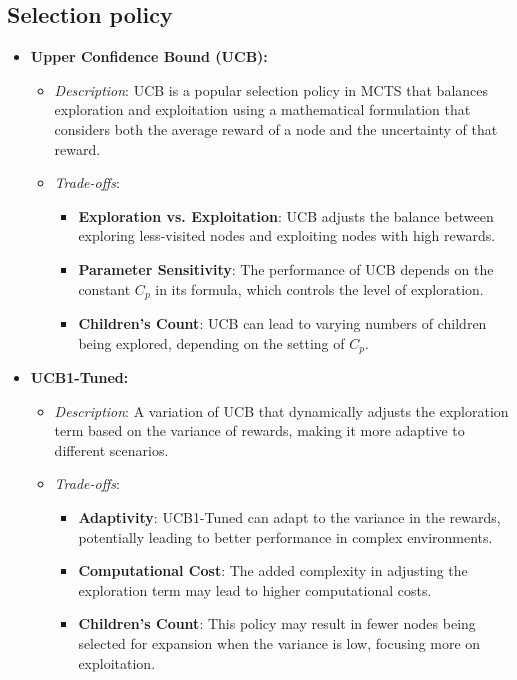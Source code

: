 \subsection{Selection policy}
\cite{different_selection_policies}
\begin{itemize}
    \item \textbf{Upper Confidence Bound (UCB):}
          \begin{itemize}
              \item \textit{Description}: UCB is a popular selection policy in MCTS that balances exploration and exploitation using a mathematical formulation that considers both the average reward of a node and the uncertainty of that reward.
              \item \textit{Trade-offs}:
                    \begin{itemize}
                        \item \textbf{Exploration vs. Exploitation}: UCB adjusts the balance between exploring less-visited nodes and exploiting nodes with high rewards.
                        \item \textbf{Parameter Sensitivity}: The performance of UCB depends on the constant \(C_p\) in its formula, which controls the level of exploration.
                        \item \textbf{Children's Count}: UCB can lead to varying numbers of children being explored, depending on the setting of \(C_p\).
                    \end{itemize}
          \end{itemize}

    \item \textbf{UCB1-Tuned:}
          \begin{itemize}
              \item \textit{Description}: A variation of UCB that dynamically adjusts the exploration term based on the variance of rewards, making it more adaptive to different scenarios.
              \item \textit{Trade-offs}:
                    \begin{itemize}
                        \item \textbf{Adaptivity}: UCB1-Tuned can adapt to the variance in the rewards, potentially leading to better performance in complex environments.
                        \item \textbf{Computational Cost}: The added complexity in adjusting the exploration term may lead to higher computational costs.
                        \item \textbf{Children's Count}: This policy may result in fewer nodes being selected for expansion when the variance is low, focusing more on exploitation.
                    \end{itemize}
          \end{itemize}


\end{itemize}
